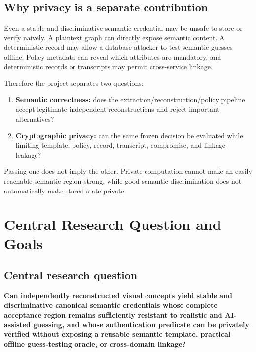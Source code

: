 \documentclass[11pt,a4paper]{article}
\begin{document}
\subsection{Why privacy is a separate contribution}

Even a stable and discriminative semantic credential may be unsafe to store or verify naively. A plaintext graph can directly expose semantic content. A deterministic record may allow a database attacker to test semantic guesses offline. Policy metadata can reveal which attributes are mandatory, and deterministic records or transcripts may permit cross-service linkage.

Therefore the project separates two questions:

\begin{enumerate}
  \item \textbf{Semantic correctness:} does the extraction/reconstruction/policy pipeline accept legitimate independent reconstructions and reject important alternatives?
  \item \textbf{Cryptographic privacy:} can the same frozen decision be evaluated while limiting template, policy, record, transcript, compromise, and linkage leakage?
\end{enumerate}

Passing one does not imply the other. Private computation cannot make an easily reachable semantic region strong, while good semantic discrimination does not automatically make stored state private.

\section{Central Research Question and Goals}

\subsection{Central research question}

\begin{keybox}
\centering
\textbf{Can independently reconstructed visual concepts yield stable and discriminative canonical semantic credentials whose complete acceptance region remains sufficiently resistant to realistic and AI-assisted guessing, and whose authentication predicate can be privately verified without exposing a reusable semantic template, practical offline guess-testing oracle, or cross-domain linkage?}
\end{keybox}
\end{document}
